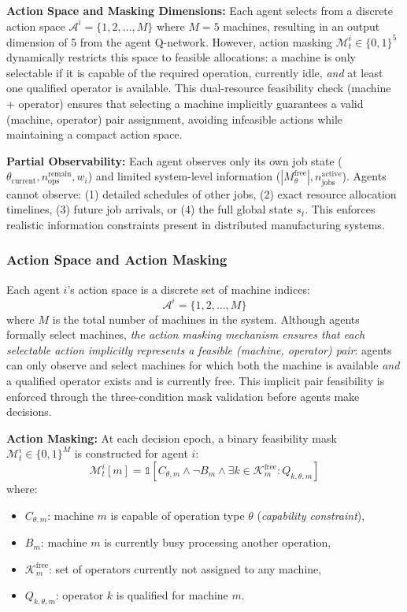 \textbf{Action Space and Masking Dimensions:} Each agent selects from a discrete action space \( \mathcal{A}^i = \{1, 2, \ldots, M\} \) where \( M = 5 \) machines, resulting in an output dimension of 5 from the agent Q-network. However, action masking \( \mathcal{M}_t^i \in \{0,1\}^5 \) dynamically restricts this space to feasible allocations: a machine is only selectable if it is capable of the required operation, currently idle, \textit{and} at least one qualified operator is available. This dual-resource feasibility check (machine + operator) ensures that selecting a machine implicitly guarantees a valid (machine, operator) pair assignment, avoiding infeasible actions while maintaining a compact action space.

\textbf{Partial Observability:} Each agent observes only its own job state (\( \theta_{\text{current}}, n_{\text{ops}}^{\text{remain}}, w_i \)) and limited system-level information (\( |M_{\theta}^{\text{free}}|, n_{\text{jobs}}^{\text{active}} \)). Agents cannot observe: (1) detailed schedules of other jobs, (2) exact resource allocation timelines, (3) future job arrivals, or (4) the full global state \( s_t \). This enforces realistic information constraints present in distributed manufacturing systems.

\subsubsection{Action Space and Action Masking}

Each agent \( i \)'s action space is a discrete set of machine indices:
\[
\mathcal{A}^i = \{1, 2, \ldots, M\}
\]
where \( M \) is the total number of machines in the system. Although agents formally select machines, \textit{the action masking mechanism ensures that each selectable action implicitly represents a feasible (machine, operator) pair}: agents can only observe and select machines for which both the machine is available \textit{and} a qualified operator exists and is currently free. This implicit pair feasibility is enforced through the three-condition mask validation before agents make decisions.

\textbf{Action Masking:} At each decision epoch, a binary feasibility mask \( \mathcal{M}_t^i \in \{0,1\}^M \) is constructed for agent \( i \):
\begin{equation}
\mathcal{M}_t^i[m] = \mathbb{1}\left[ C_{\theta,m} \land \neg B_m \land \exists k \in \mathcal{K}_m^{\text{free}} : Q_{k,\theta,m} \right]
\end{equation}
where:
\begin{itemize}
    \item \( C_{\theta,m} \): machine \( m \) is capable of operation type \( \theta \) (\textit{capability constraint}),
    \item \( B_m \): machine \( m \) is currently busy processing another operation,
    \item \( \mathcal{K}_m^{\text{free}} \): set of operators currently not assigned to any machine,
    \item \( Q_{k,\theta,m} \): operator \( k \) is qualified for machine \( m \).
\end{itemize}

